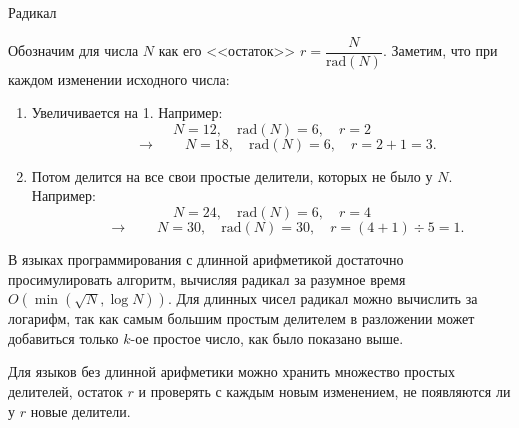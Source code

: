 \begin{tutorial}{Радикал}

Обозначим для числа $N$ как его <<остаток>> $r=\dfrac{N}{\text{rad}(N)}$. Заметим, что при каждом изменении исходного числа:
\begin{enumerate}
\item Увеличивается на 1. Например:
$$N=12,\quad \text{rad}(N)=6,\quad r=2$$
$$\qquad\rightarrow\qquad N=18,\quad \text{rad}(N)=6,\quad r=2+1=3.$$
\item Потом делится на все свои простые делители, которых не было у $N$. Например:
$$N=24,\quad \text{rad}(N)=6,\quad r=4$$
$$\qquad\rightarrow\qquad N=30,\quad \text{rad}(N)=30,\quad r=(4 + 1) \div 5=1.$$
\end{enumerate}

В языках программирования с длинной арифметикой достаточно просимулировать алгоритм, вычисляя радикал за разумное время $O(\min(\sqrt{N},\log{N}))$. Для длинных чисел радикал можно вычислить за логарифм, так как самым большим простым делителем в разложении может добавиться только $k$-ое простое число, как было показано выше.

Для языков без длинной арифметики можно хранить множество простых делителей, остаток $r$ и проверять с каждым новым изменением, не появляются ли у $r$ новые делители.

\end{tutorial}
